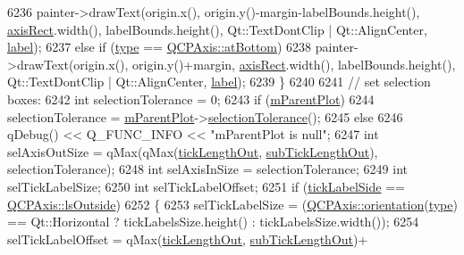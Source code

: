 \begin{DoxyCode}
6236       painter->drawText(origin.x(), origin.y()-margin-labelBounds.height(), 
      \hyperlink{class_q_c_p_axis_painter_private_afcd55b0e1ecd689fffd2b1fc75dc7732}{axisRect}.width(), labelBounds.height(), Qt::TextDontClip | Qt::AlignCenter, 
      \hyperlink{class_q_c_p_axis_painter_private_afe004c322f92543c0467afc02da6cf6d}{label});
6237     \textcolor{keywordflow}{else} \textcolor{keywordflow}{if} (\hyperlink{class_q_c_p_axis_painter_private_ae04594e97417336933d807c86d353098}{type} == \hyperlink{class_q_c_p_axis_ae2bcc1728b382f10f064612b368bc18aa220d68888516b6c3b493d144f1ba438f}{QCPAxis::atBottom})
6238       painter->drawText(origin.x(), origin.y()+margin, \hyperlink{class_q_c_p_axis_painter_private_afcd55b0e1ecd689fffd2b1fc75dc7732}{axisRect}.width(), labelBounds.height(), 
      Qt::TextDontClip | Qt::AlignCenter, \hyperlink{class_q_c_p_axis_painter_private_afe004c322f92543c0467afc02da6cf6d}{label});
6239   \}
6240   
6241   \textcolor{comment}{// set selection boxes:}
6242   \textcolor{keywordtype}{int} selectionTolerance = 0;
6243   \textcolor{keywordflow}{if} (\hyperlink{class_q_c_p_axis_painter_private_a882029a5f2d4abd71289d415c9b90a28}{mParentPlot})
6244     selectionTolerance = \hyperlink{class_q_c_p_axis_painter_private_a882029a5f2d4abd71289d415c9b90a28}{mParentPlot}->\hyperlink{class_q_custom_plot_a7b738074c75e80070ef6a10263c6cd69}{selectionTolerance}();
6245   \textcolor{keywordflow}{else}
6246     qDebug() << Q\_FUNC\_INFO << \textcolor{stringliteral}{"mParentPlot is null"};
6247   \textcolor{keywordtype}{int} selAxisOutSize = qMax(qMax(\hyperlink{class_q_c_p_axis_painter_private_acbebb1f868906200f968627bc907b77d}{tickLengthOut}, \hyperlink{class_q_c_p_axis_painter_private_a5f1afddc3dc7ccc4d5adcbcd8f0c2218}{subTickLengthOut}), 
      selectionTolerance);
6248   \textcolor{keywordtype}{int} selAxisInSize = selectionTolerance;
6249   \textcolor{keywordtype}{int} selTickLabelSize;
6250   \textcolor{keywordtype}{int} selTickLabelOffset;
6251   \textcolor{keywordflow}{if} (\hyperlink{class_q_c_p_axis_painter_private_a9d27f7625fcfbeb3a60193d0c18fc7e9}{tickLabelSide} == \hyperlink{class_q_c_p_axis_a24b13374b9b8f75f47eed2ea78c37db9a2eadb509fc0c9a8b35b85c86ec9f3c7a}{QCPAxis::lsOutside})
6252   \{
6253     selTickLabelSize = (\hyperlink{class_q_c_p_axis_a57483f2f60145ddc9e63f3af53959265}{QCPAxis::orientation}(\hyperlink{class_q_c_p_axis_painter_private_ae04594e97417336933d807c86d353098}{type}) == Qt::Horizontal ? 
      tickLabelsSize.height() : tickLabelsSize.width());
6254     selTickLabelOffset = qMax(\hyperlink{class_q_c_p_axis_painter_private_acbebb1f868906200f968627bc907b77d}{tickLengthOut}, \hyperlink{class_q_c_p_axis_painter_private_a5f1afddc3dc7ccc4d5adcbcd8f0c2218}{subTickLengthOut})+

\end{DoxyCode}
